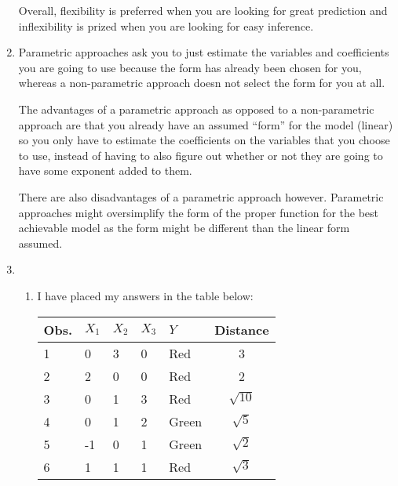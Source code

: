 \documentclass[11pt]{article}
\begin{document}
\begin{enumerate}
        Overall, flexibility is preferred when you are looking for great prediction and inflexibility is prized when you are looking for easy inference.
  
  \item Parametric approaches ask you to just estimate the variables and coefficients you are going to use because the form has already been chosen for you, whereas a non-parametric approach doesn not select the form for you at all.

        The advantages of a parametric approach as opposed to a non-parametric approach are that you already have an assumed ``form'' for the model (linear) so you only have to estimate the coefficients on the variables that you choose to use, instead of having to also figure out whether or not they are going to have some exponent added to them.
        
        There are also disadvantages of a parametric approach however. Parametric approaches might oversimplify the form of the proper function for the best achievable model as the form might be different than the linear form assumed.
  
  \item
    \begin{enumerate}
      \item I have placed my answers in the table below:
        
        \begin{table}[h]
            \centering
            \begin{tabular}{l|llll|c} \hline
                Obs. & $X_1$ & $X_2$ & $X_3$ & $Y$   & Distance       \\ \hline
                1    & 0     & 3     & 0     & Red   & 3              \\
                2    & 2     & 0     & 0     & Red   & 2              \\
                3    & 0     & 1     & 3     & Red   & $\sqrt{10}$    \\
                4    & 0     & 1     & 2     & Green & $\sqrt{5} $    \\
                5    & -1    & 0     & 1     & Green & $\sqrt{2} $    \\
                6    & 1     & 1     & 1     & Red   & $\sqrt{3} $    \\ \hline
            \end{tabular}
        \end{table}


\end{enumerate}
\end{enumerate}
\end{document}
